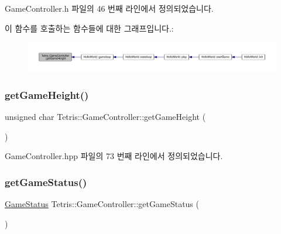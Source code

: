 Game\+Controller.\+h 파일의 46 번째 라인에서 정의되었습니다.

이 함수를 호출하는 함수들에 대한 그래프입니다.\+:
\nopagebreak
\begin{figure}[H]
\begin{center}
\leavevmode
\includegraphics[width=350pt]{class_tetris_1_1_game_controller_a10163479e02572450b886ff0654078b4_icgraph}
\end{center}
\end{figure}
\mbox{\label{class_tetris_1_1_game_controller_a10163479e02572450b886ff0654078b4}} 
\subsubsection{\texorpdfstring{get\+Game\+Height()}{getGameHeight()}\hspace{0.1cm}{\footnotesize\ttfamily [2/2]}}
{\footnotesize\ttfamily unsigned char Tetris\+::\+Game\+Controller\+::get\+Game\+Height (\begin{DoxyParamCaption}{ }\end{DoxyParamCaption})\hspace{0.3cm}{\ttfamily [inline]}}



Game\+Controller.\+hpp 파일의 73 번째 라인에서 정의되었습니다.

\mbox{\label{class_tetris_1_1_game_controller_a3b95b1b7a3a18c27402100f70c1ac1ab}} 
\subsubsection{\texorpdfstring{get\+Game\+Status()}{getGameStatus()}\hspace{0.1cm}{\footnotesize\ttfamily [1/2]}}
{\footnotesize\ttfamily \hyperlink{class_tetris_1_1_game_controller_a96a963b56385f3b3a122ff0ca2beb770}{Game\+Status} Tetris\+::\+Game\+Controller\+::get\+Game\+Status (\begin{DoxyParamCaption}{ }\end{DoxyParamCaption})\hspace{0.3cm}{\ttfamily [inline]}}



